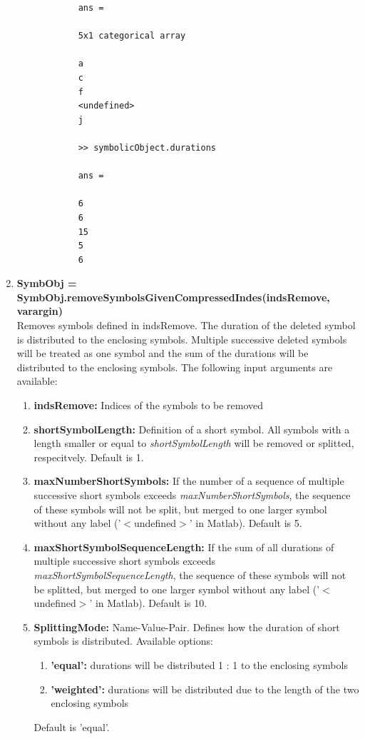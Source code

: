 \documentclass[a4]{scrreprt}
\begin{document}
\begin{enumerate}
\begin{verbatim}
			ans = 
			
			5x1 categorical array
			
			a 
			c 
			f 
			<undefined> 
			j 
			
			>> symbolicObject.durations
			
			ans =
			
			6
			6
			15
			5
			6
			\end{verbatim}
			
			
	\item \textbf{SymbObj = SymbObj.removeSymbolsGivenCompressedIndes(indsRemove, varargin)}\\
			Removes symbols defined in indsRemove. The duration of the deleted symbol is distributed to the enclosing symbols. Multiple successive deleted symbols will be treated as one symbol and the sum of the durations will be distributed to the enclosing symbols.
			The following input arguments are available:
			\begin{enumerate}
				\item \textbf{indsRemove: } Indices of the symbols to be removed
				\item \textbf{shortSymbolLength: } Definition of a short symbol. All symbols with a length smaller or equal to \textit{shortSymbolLength} will be removed or splitted, respecitvely. Default is 1.
				\item \textbf{maxNumberShortSymbols: } If the number of a sequence of multiple successive short symbols exceeds \textit{maxNumberShortSymbols}, the sequence of these symbols will not be split, but merged to one larger symbol without any label ('$<$undefined$>$' in Matlab). Default is 5.
				\item \textbf{maxShortSymbolSequenceLength: } If the sum of all durations of multiple successive short symbols exceeds \textit{maxShortSymbolSequenceLength}, the sequence of these symbols will not be splitted, but merged to one larger symbol without any label ('$<$undefined$>$' in Matlab). Default is 10.
				\item \textbf{SplittingMode: } Name-Value-Pair. Defines how the duration of short symbols is distributed. Available options: 
				\begin{enumerate}
					\item \textbf{'equal':} durations will be distributed 1 : 1 to the enclosing symbols
					\item \textbf{'weighted':} durations will be distributed due to the length of the two enclosing symbols
				\end{enumerate}
				Default is 'equal'.	
			\end{enumerate}
			

\end{enumerate}
\end{document}
